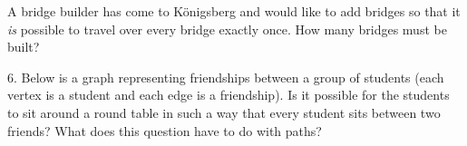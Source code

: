 \documentclass[10pt,]{book}
\theoremstyle{plain}
\theoremstyle{definition}
\theoremstyle{definition}
\theoremstyle{definition}
\numberwithin{equation}{chapter}
\newcommand{\vtx}[2]{node[fill,circle,inner sep=0pt, minimum size=4pt,label=#1:#2]{}}
\renewcommand{\v}{\vtx{above}{}}
\begin{document}
\begin{exerciselist}
A bridge builder has come to Königsberg and would like to add bridges so that it \emph{is} possible to travel over every bridge exactly once. How many bridges must be built?
%
\par\smallskip
\item[6.]\hypertarget{exercise-293}{}
Below is a graph representing friendships between a group of students (each vertex is a student and each edge is a friendship). Is it possible for the students to sit around a round table in such a way that every student sits between two friends? What does this question have to do with paths?
%
\leavevmode%
\begin{figure}
\centering
{
}
\end{figure}
\par\smallskip
\end{exerciselist}
\typeout{************************************************}
\typeout{************************************************}
\end{document}
